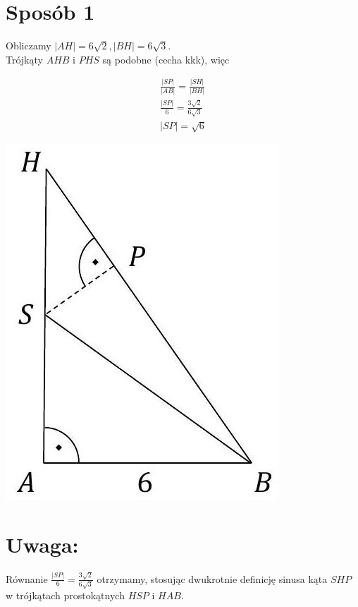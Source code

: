 \documentclass[10pt]{article}
\begin{document}
\section*{Sposób 1}
Obliczamy $|A H|=6 \sqrt{2},|B H|=6 \sqrt{3}$.\\
Trójkąty $A H B$ i $P H S$ są podobne (cecha kkk), więc

$$
\begin{gathered}
\frac{|S P|}{|A B|}=\frac{|S H|}{|B H|} \\
\frac{|S P|}{6}=\frac{3 \sqrt{2}}{6 \sqrt{3}} \\
|S P|=\sqrt{6}
\end{gathered}
$$

\begin{center}
\includegraphics[max width=\textwidth]{2025_02_07_dcb3d059df06a3930b0ag-34}
\end{center}

\section*{Uwaga:}
Równanie $\frac{|S P|}{6}=\frac{3 \sqrt{2}}{6 \sqrt{3}}$ otrzymamy, stosując dwukrotnie definicję sinusa kąta $S H P$ w trójkątach prostokątnych $H S P$ i $H A B$.
\end{document}
